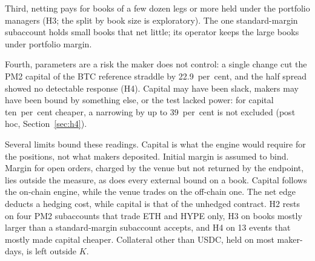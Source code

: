 \documentclass[a4paper,fleqn]{cas-dc}
\begin{document}
Third, netting pays for books of a few dozen legs or more held under the portfolio managers (H3; the split by book size
is exploratory). The one
standard-margin subaccount holds small books that net little; its operator keeps the large books under
portfolio margin.

Fourth, parameters are a risk the maker does not control: a single change cut the PM2 capital of the BTC
reference straddle by 22.9~per~cent, and the half spread showed no detectable response (H4). Capital may have
been slack, makers may have been bound by something else, or the test lacked power: for capital ten~per~cent
cheaper, a narrowing by up to 39~per~cent is not excluded (post hoc, Section~\ref{sec:h4}).

Several limits bound these readings. Capital is what the engine would require for the positions, not what makers
deposited. Initial margin is assumed to bind. Margin for open orders, charged by the venue but not returned by the
endpoint, lies outside the measure, as does every external bound on a book. Capital follows the on-chain engine,
while the venue trades on the off-chain one. The net edge deducts a hedging cost, while capital is that of the
unhedged contract. H2 rests on four PM2 subaccounts that trade ETH and HYPE only, H3 on books mostly larger than a
standard-margin subaccount accepts, and H4 on 13 events that mostly made capital cheaper. Collateral other than
USDC, held on most maker-days, is left outside $K$.

\FloatBarrier
\end{document}
